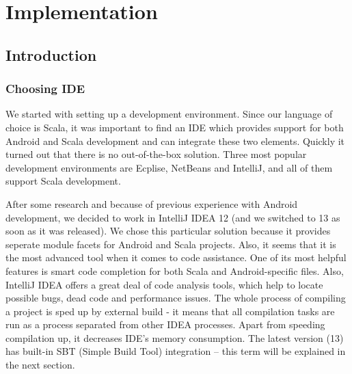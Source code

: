 %
%
%
%
%

\chapter{Implementation}
\label{chap:implementation}

\section{Introduction}
\label{sec:impl-intro}

\subsection{Choosing IDE}
\label{subsec:choosing-ide}
We started with setting up a development environment. Since our language of choice is Scala, it was important to find an IDE which provides support for both Android and Scala development and can integrate these two elements. Quickly it turned out that there is no out-of-the-box solution. Three most popular development environments are Ecplise, NetBeans and IntelliJ, and all of them support Scala development. 

After some research and because of previous experience with Android development, we decided to work in IntelliJ IDEA 12 (and we switched to 13 as soon as it was released). We chose this particular solution because it provides seperate module facets for Android and Scala projects\cite{Steingress:2011:AndroidScala}. Also, it seems that it is the most advanced tool when it comes to code assistance. One of its most helpful features is smart code completion for both Scala and Android-specific files\cite{Steingress:2011:AndroidScala}. Also, IntelliJ IDEA offers a great deal of code analysis tools, which help to locate possible bugs, dead code and performance issues. The whole process of compiling a project is sped up by external build - it means that all compilation tasks are run as a process separated from other IDEA processes. Apart from speeding compilation up, it decreases IDE's memory consumption\cite{Fatin:2012:NewWay}. The latest version (13)  has built-in SBT (Simple Build Tool) integration -- this term will be explained in the next section. 

